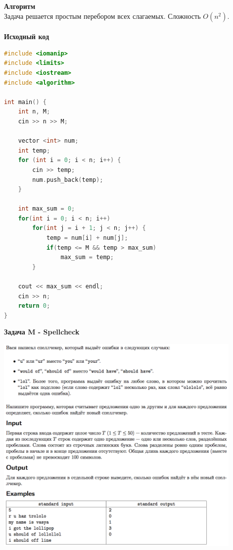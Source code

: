 \documentclass[a4paper,12pt]{article}
\begin{document}
\textbf{{\large Алгоритм}} \\
Задача решается простым перебором всех слагаемых. Сложность $O(n^2)$. \\ 
\\
\textbf{{\large Исходный код}}
\begin{lstlisting}[language=C++]
#include <iomanip>
#include <limits>
#include <iostream>
#include <algorithm>

int main() {
    int n, M;
	cin >> n >> M;

	vector <int> num;
	int temp;
	for (int i = 0; i < n; i++) {
		cin >> temp;
		num.push_back(temp);
	}

	int max_sum = 0;
	for(int i = 0; i < n; i++)
		for(int j = i + 1; j < n; j++) {
			temp = num[i] + num[j];
			if(temp <= M && temp > max_sum)
				max_sum = temp;
		}

	cout << max_sum << endl;
    cin >> n;
    return 0;
}
\end{lstlisting}
\newpage
\textbf{{\large Задача M - Spellcheck}} \\
\begin{center}
\includegraphics[width=0.9\textwidth]{OC_Japan/OC_Japan_M.png}\\ [1cm]
\end{center}
\newpage
\end{document}
